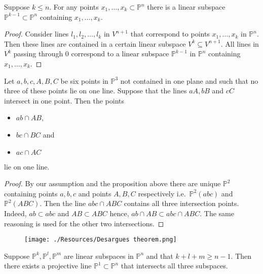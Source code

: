 \documentclass[12pt, a4paper]{article}
\newcommand{\PP}{\mathbb P}
\begin{document}
\begin{mdprop}
    Suppose \(k \leq n\). For any points \(x_1,\ldots,x_k \subset \mathbb{P}^n\) there is a linear subspace \(\mathbb{P}^{k-1} \subset \mathbb{P}^n\) containing \(x_1,\ldots,x_k\).
\end{mdprop}

\begin{proof}
    Consider lines \(l_1, l_2, \ldots, l_k\) in \(V^{n+1}\) that correspond to points \(x_1, \ldots, x_k\) in \(\mathbb{P}^n\). Then these lines are contained in a certain linear subspace \(V^k \subseteq V^{n+1}\). All lines in \(V^k\) passing through 0 correspond to a linear subspace \(\mathbb{P}^{k-1}\) in \(\mathbb{P}^n\) containing \(x_1, \ldots, x_k\).
\end{proof}

\begin{mdthm}
    Let \(a,b,c,A,B,C\) be six points in \(\PP^3\) not contained in one plane and such that no three of these points lie on one line. Suppose that the lines \(aA, bB\) and \(cC\) intersect in one point. Then the points 
    \begin{itemize}
        \item \(ab\cap AB\),
        \item \(bc \cap BC\) and 
        \item \(ac\cap AC\)
    \end{itemize}
    lie on one line.
\end{mdthm}

\begin{proof}
    By our assumption and the proposition above there are unique \(\PP^2\) containing points \(a,b,c\) and points \(A,B,C\) respectively i.e.\ \(\PP^2(abc)\) and \(\PP^2(ABC)\). Then the line \(abc\cap ABC\) contains all three intersection points. Indeed, \(ab \subset abc\) and \(AB \subset ABC\) hence, \(ab \cap AB \subset abc\cap ABC\). The same reasoning is used for the other two intersections.
\end{proof}

\begin{figure}[H]
     \begin{center}
         \texttt{[image: ./Resources/Desargues theorem.png]}
     \end{center}
\end{figure}


\begin{mdthm}
    Suppose \(\mathbb{P}^k,\mathbb{P}^l,\mathbb{P}^m\) are linear subspaces in \(\mathbb{P}^n\) and that \(k+l+m\geq n-1\). Then there exists a projective line \(\mathbb{P}^1\subset \mathbb{P}^n\) that intersects all three subspaces.
\end{mdthm}
\end{document}
